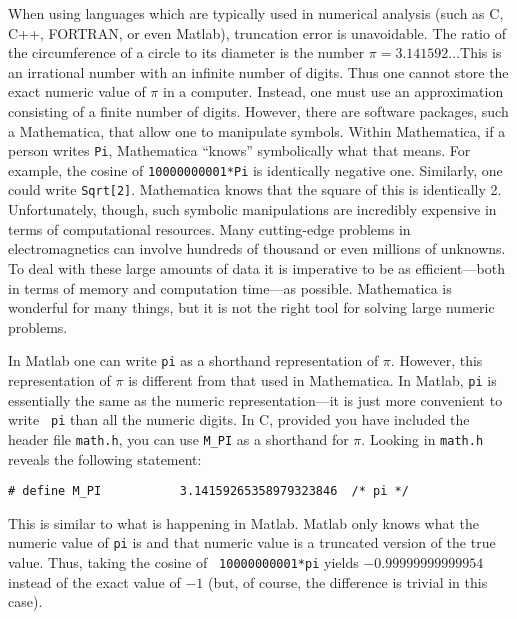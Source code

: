 When using languages which are typically used in numerical analysis
(such as C, C++, FORTRAN, or even Matlab), truncation error is
unavoidable.  The ratio of the circumference of a circle to its
diameter is the number $\pi=3.141592\ldots$\@ This is an irrational
number with an infinite number of digits.  Thus one cannot store the
exact numeric value of $\pi$ in a computer.  Instead, one must use an
approximation consisting of a finite number of digits.  However, there
are software packages, such a Mathematica, that allow one to
manipulate symbols.  Within Mathematica, if a person writes {\tt Pi},
Mathematica ``knows'' symbolically what that means.  For example, the
cosine of {\tt 10000000001*Pi} is identically negative one.
Similarly, one could write {\tt Sqrt[2]}.  Mathematica knows that the
square of this is identically 2.  Unfortunately, though, such symbolic
manipulations are incredibly expensive in terms of computational
resources.  Many cutting-edge problems in electromagnetics can involve
hundreds of thousand or even millions of unknowns.  To deal with these
large amounts of data it is imperative to be as efficient---both in
terms of memory and computation time---as possible.  Mathematica is
wonderful for many things, but it is not the right tool for solving
large numeric problems.

In Matlab one can write {\tt pi} as a shorthand representation of
$\pi$.  However, this representation of $\pi$ is different from that
used in Mathematica.  In Matlab, {\tt pi} is essentially the same as
the numeric representation---it is just more convenient to write {\tt
pi} than all the numeric digits.  In C, provided you have included the
header file {\tt math.h}, you can use {\tt M\_PI} as a shorthand for
$\pi$.  Looking in {\tt math.h} reveals the following statement:
\begin{verbatim}
# define M_PI           3.14159265358979323846  /* pi */
\end{verbatim}
This is similar to what is happening in Matlab.  Matlab only knows
what the numeric value of {\tt pi} is and that numeric value is a
truncated version of the true value.  Thus, taking the cosine of {\tt
10000000001*pi} yields $-0.99999999999954$ instead of the exact value
of $-1$ (but, of course, the difference is trivial in this case).

